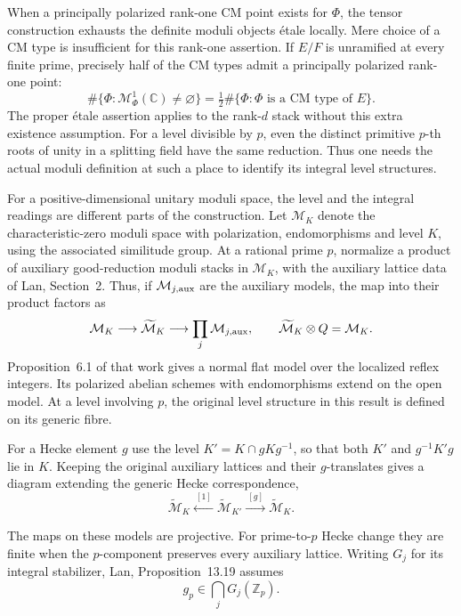 When a principally polarized rank-one CM point exists for \(\Phi\),
the tensor construction exhausts the definite moduli objects \'etale
locally. Mere choice of a CM type is insufficient for this rank-one
assertion. If \(E/F\) is unramified at every finite prime, precisely
half of the CM types admit a principally polarized rank-one point:
\[
 \#\{\Phi:\mathcal M_\Phi^1(\mathbb C)\ne\varnothing\}
 =\tfrac12\#\{\Phi:\Phi\text{ is a CM type of }E\}.
\]
The proper \'etale assertion applies to the rank-\(d\) stack without
this extra existence assumption. For a level divisible by \(p\), even
the distinct primitive \(p\)-th roots of unity in a splitting field
have the same reduction. Thus one needs the actual moduli definition
at such a place to identify its integral level structures.
\cite[Theorems~46 and~52]{amir-khosravi-serre}

For a positive-dimensional unitary moduli space, the level and the
integral readings are different parts of the construction. Let
\(\mathcal M_K\) denote the characteristic-zero moduli space with
polarization, endomorphisms and level \(K\), using the associated
similitude group. At a rational prime \(p\), normalize a product
of auxiliary good-reduction moduli stacks in \(\mathcal M_K\), with
the auxiliary lattice data of Lan, Section~2. Thus, if \(\mathcal M_{j,\rm aux}\)
are the auxiliary models, the map into their product factors as
\[
 \mathcal M_K\longrightarrow\widetilde{\mathcal M}_K
 \longrightarrow \prod_j\mathcal M_{j,\rm aux},
 \qquad \widetilde{\mathcal M}_K\otimes\mathbb Q=\mathcal M_K .
\]
Proposition~6.1 of
that work gives a normal flat model over the localized reflex
integers. Its polarized abelian schemes with endomorphisms extend
on the open model. At a level involving \(p\), the original level
structure in this result is defined on its generic fibre.
\cite[Propositions~6.1 and~6.4]{lan-ramified-models}

For a Hecke element \(g\) use the level
\(K'=K\cap gKg^{-1}\), so that both \(K'\) and \(g^{-1}K'g\) lie
in \(K\). Keeping the original auxiliary lattices and their \(g\)-translates
gives a diagram extending the generic Hecke correspondence,
\[
   \widetilde{\mathcal M}_K\xleftarrow{\ [1]\ }
   \widetilde{\mathcal M}_{K'}\xrightarrow{\ [g]\ }
   \widetilde{\mathcal M}_K .
\]

The maps on these models are projective. For prime-to-\(p\) Hecke
change they are finite when the \(p\)-component preserves every auxiliary lattice. Writing \(G_j\) for its integral stabilizer, Lan, Proposition~13.19 assumes
\[
             g_p\in\bigcap_j G_j(\mathbb Z_p).
\] 

